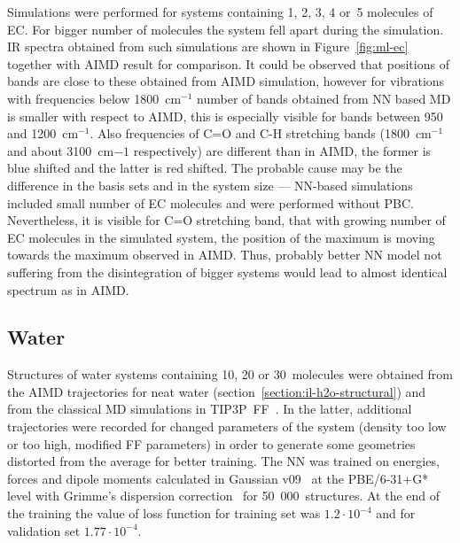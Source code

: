 Simulations were performed for systems containing 1, 2, 3, 4 or~5 molecules of EC. For bigger number of molecules the system fell apart during the simulation. IR spectra obtained from such simulations are shown in Figure~\ref{fig:ml-ec} together with AIMD result for comparison. It could be observed that positions of bands are close to these obtained from AIMD simulation, however for vibrations with frequencies below 1800~cm$^{-1}$ number of bands obtained from NN based MD is smaller with respect to AIMD, this is especially visible for bands between 950 and 1200~cm$^{-1}$. Also frequencies of C=O and C-H stretching bands (1800~cm$^{-1}$ and about 3100~cm${-1}$ respectively) are different than in AIMD, the former is blue shifted and the latter is red shifted. The probable cause may be the difference in the basis sets and in the system size --- NN-based simulations included small number of EC molecules and were performed without PBC. Nevertheless, it is visible for C=O stretching band, that with growing number of EC molecules in the simulated system, the position of the maximum is moving towards the maximum observed in AIMD. Thus, probably better NN model not suffering from the disintegration of bigger systems would lead to almost identical spectrum as in AIMD.

\subsection{Water}

Structures of water systems containing 10, 20 or 30~molecules were obtained from the AIMD trajectories for neat water (section~\ref{section:il-h2o-structural}) and from the classical MD simulations in TIP3P~FF~\cite{tip3p-1,tip3p-2}. In the latter, additional trajectories were recorded for changed parameters of the system (density too low or too high, modified FF parameters) in order to generate some geometries distorted from the average for better training. The NN was trained on energies, forces and dipole moments calculated in Gaussian v09~\cite{gaussian} at the PBE/6-31+G* level with Grimme's dispersion correction~\cite{grimme-d3} for 50~000~structures. At the end of the training the value of loss function for training set was $1.2\cdot 10^{-4}$ and for validation set $1.77\cdot 10^{-4}$.

